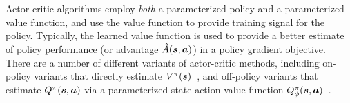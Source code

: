 \documentclass[../thesis.tex]{subfiles}
\begin{document}
~


~

Actor-critic algorithms employ \emph{both} a parameterized policy and a parameterized value function, and use the value function to provide training signal for the policy. Typically, the learned value function is used to provide a better estimate of policy performance (or advantage $\hat{A}(\boldsymbol{s},\boldsymbol{a})$) in a policy gradient objective. There are a number of different variants of actor-critic methods, including on-policy variants that directly estimate $V^\pi(\boldsymbol{s})$~\citep{konda2000actor}, and off-policy variants that estimate $Q^\pi(\boldsymbol{s},\boldsymbol{a})$ via a parameterized state-action value function $Q^\pi_\phi(\boldsymbol{s},\boldsymbol{a})$~\citep{sac,haarnoja2017reinforcement,heess2015learning}. 
\end{document}
